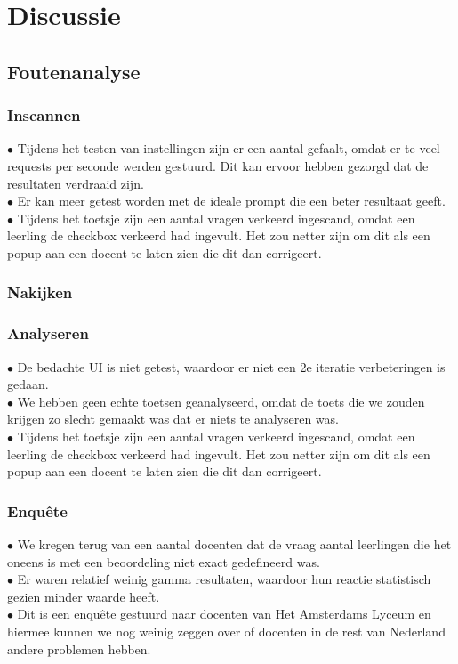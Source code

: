 \documentclass[12pt]{article}
\begin{document}
\pagebreak
\section{Discussie}
\subsection{Foutenanalyse}
\begin{multicols}{2}
\subsubsection{Inscannen}
$\bullet$ Tijdens het testen van instellingen zijn er een aantal gefaalt, omdat er te veel requests per seconde werden gestuurd. Dit kan ervoor hebben gezorgd dat de resultaten verdraaid zijn.\\
$\bullet$ Er kan meer getest worden met de ideale prompt die een beter resultaat geeft. \\
$\bullet$ Tijdens het toetsje zijn een aantal vragen verkeerd ingescand, omdat een leerling de checkbox verkeerd had ingevult. Het zou netter zijn om dit als een popup aan een docent te laten zien die dit dan corrigeert.\\

\subsubsection{Nakijken}
\subsubsection{Analyseren}
$\bullet$ De bedachte UI is niet getest, waardoor er niet een 2e iteratie verbeteringen is gedaan.\\
$\bullet$ We hebben geen echte toetsen geanalyseerd, omdat de toets die we zouden krijgen zo slecht gemaakt was dat er niets te analyseren was.\\
$\bullet$ Tijdens het toetsje zijn een aantal vragen verkeerd ingescand, omdat een leerling de checkbox verkeerd had ingevult. Het zou netter zijn om dit als een popup aan een docent te laten zien die dit dan corrigeert.\\
\begin{minipage}{\linewidth}
    
\subsubsection{Enquête}
$\bullet$ We kregen terug van een aantal docenten dat de vraag aantal leerlingen die het oneens is met een beoordeling niet exact gedefineerd was.\\
$\bullet$ Er waren relatief weinig gamma resultaten, waardoor hun reactie statistisch gezien minder waarde heeft.\\
$\bullet$ Dit is een enquête gestuurd naar docenten van Het Amsterdams Lyceum en hiermee kunnen we nog weinig zeggen over of docenten in de rest van Nederland andere problemen hebben.\\
\end{minipage}
\begin{minipage}{\linewidth}

\end{minipage}
\end{multicols}
\end{document}
